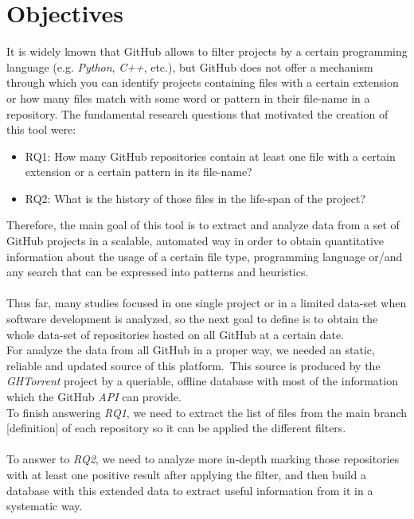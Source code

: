 \documentclass[a4paper, 12pt]{book}
\begin{document}
\chapter{Objectives}
\label{sec:objectives}
It is widely known that GitHub allows to filter projects by a certain programming language (e.g.
\emph{Python}, \emph{C++}, etc.), but GitHub does not offer a mechanism through which you can identify projects
containing files with a certain extension or how many files match with some word or pattern in their
file-name in a repository. The fundamental research questions that motivated the creation of this tool were:
\begin{itemize}
  \item RQ1: How many GitHub repositories contain at least one file with a certain extension or a certain
        pattern in its file-name?
  \item RQ2: What is the history of those files in the life-span of the project?
\end{itemize}
Therefore, the main goal of this tool is to extract and analyze data from a set of GitHub projects in a scalable,
automated way in order to obtain quantitative information about the usage of a certain file type, programming language
or/and any search that can be expressed into patterns and heuristics.\\\\
Thus far, many studies focused in one single project or in a limited data-set when software development is analyzed, so
the next goal to define is to obtain the whole data-set of repositories hosted on all GitHub at a certain date.\\
For analyze the data from all GitHub in a proper way, we needed an static, reliable and updated source of this platform.\
This source is produced by the \emph{GHTorrent} project by a queriable, offline database with most of the information which the
GitHub \textit{API} can provide.\\
To finish answering \emph{RQ1}, we need to extract the list of files from the main branch [definition] of each repository so
it can be applied the different filters.\\\\
To answer to \emph{RQ2}, we need to analyze more in-depth marking those repositories with at least one positive result
after applying the filter, and then build a database with this extended data to extract useful information from it in a
systematic way.
\cleardoublepage
\end{document}
